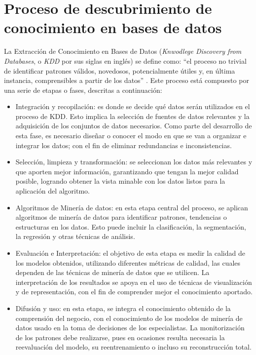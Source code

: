 \section{Proceso de descubrimiento de conocimiento en bases de datos}\label{kdd}
La Extracción de Conocimiento en Bases de Datos (\textit{Knwodlege Discovery from Databases}, o \textit{KDD} por sus siglas en inglés) se define como: “el proceso no trivial de identificar patrones válidos, novedosos, potencialmente útiles y, en última instancia, comprensibles a partir de los datos” \citep{orallo2004}. Este proceso está compuesto por una serie de etapas o fases, descritas a continuación:
\begin{itemize}
	\item Integración y recopilación: es donde se decide qué datos serán utilizados en el proceso de KDD. Esto implica la selección de fuentes de datos relevantes y la adquisición de los conjuntos de datos necesarios.  Como parte del desarrollo de esta fase, es necesario diseñar o conocer el modo en que se van a organizar e integrar los datos; con el fin de eliminar redundancias e inconsistencias.
	\item Selección, limpieza y transformación: se seleccionan los datos más relevantes y que aporten mejor información, garantizando que tengan la mejor calidad posible, logrando obtener la vista minable con los datos listos para la aplicación del algoritmo.
	\item Algoritmos de Minería de datos: en esta etapa central del proceso, se aplican algoritmos de minería de datos para identificar patrones, tendencias o estructuras en los datos. Esto puede incluir la clasificación, la segmentación, la regresión y otras técnicas de análisis.
	\item Evaluación e Interpretación: el objetivo de esta etapa es medir la calidad de los modelos obtenidos, utilizando diferentes métricas de calidad, las cuales dependen de las técnicas de minería de datos que se utilicen. La interpretación de los resultados se apoya en el uso de técnicas de visualización y de representación, con el fin de comprender mejor el conocimiento aportado. 
	\item Difusión y uso: en esta etapa, se integra el conocimiento obtenido de la comprensión del negocio, con el conocimiento de los modelos de minería de datos usado en la toma de decisiones de los especialistas. La monitorización de los patrones debe realizarse, pues en ocasiones resulta necesaria la reevaluación del modelo, su reentrenamiento o incluso su reconstrucción total.
\end{itemize}

